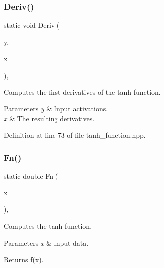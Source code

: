 \subsubsection{Deriv()\hspace{0.1cm}{\footnotesize\ttfamily [2/2]}}
{\footnotesize\ttfamily static void Deriv (\begin{DoxyParamCaption}\item[{const Input\+Vec\+Type \&}]{y,  }\item[{Output\+Vec\+Type \&}]{x }\end{DoxyParamCaption})\hspace{0.3cm}{\ttfamily [inline]}, {\ttfamily [static]}}



Computes the first derivatives of the tanh function. 


\begin{DoxyParams}{Parameters}
{\em y} & Input activations. \\
\hline
{\em x} & The resulting derivatives. \\
\hline
\end{DoxyParams}


Definition at line 73 of file tanh\+\_\+function.\+hpp.

\mbox{\label{classmlpack_1_1ann_1_1TanhFunction_a11bd9a1195e6b107f9fee73643bc328b}} 
\subsubsection{Fn()\hspace{0.1cm}{\footnotesize\ttfamily [1/2]}}
{\footnotesize\ttfamily static double Fn (\begin{DoxyParamCaption}\item[{const double}]{x }\end{DoxyParamCaption})\hspace{0.3cm}{\ttfamily [inline]}, {\ttfamily [static]}}



Computes the tanh function. 


\begin{DoxyParams}{Parameters}
{\em x} & Input data. \\
\hline
\end{DoxyParams}
\begin{DoxyReturn}{Returns}
f(x). 
\end{DoxyReturn}


